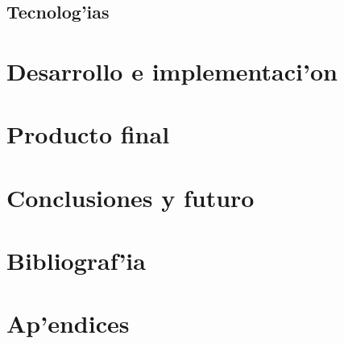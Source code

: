 \documentclass{article}
\begin{document}
	\subsection{Tecnolog'ias}
\section{Desarrollo e implementaci'on}
\section{Producto final}
\section{Conclusiones y futuro}
\section{Bibliograf'ia}
\section{Ap'endices}
\end{document}
